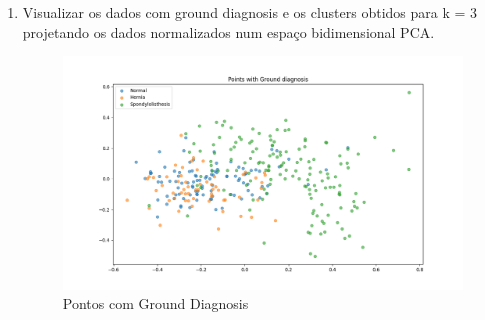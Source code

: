 \documentclass[a4paper,12pt]{article} %
\begin{document}
\begin{enumerate}
Entender a importância de cada variável nas componentes principais é crucial para interpretar e 
utilizar de forma eficiente a técnica do PCA e ajuda a melhorar a qualidade das análises. \\

Código Utilizado:

\begin{lstlisting}[language=Python]
pca = PCA(n_components=2)
pca.fit(features_scaled)
X_pca = pca.transform(features_scaled)

print("Components (eigenvectors):\n",pca.components_)
print("Explained variance (ratio) =",pca.explained_variance_ratio_)

xvector = pca.components_[0] * max(X_pca[:,0])
yvector = pca.components_[1] * max(X_pca[:,1])

columns = features.columns
features1_rel = {columns[i] : math.sqrt(xvector[i]**2) for i in range(len(columns))}
sorted_features1 = sorted(zip(features1_rel.values(), features1_rel.keys()),reverse=True)
print('Features sorted by relevance for the first component: \n')
for i in range(len(sorted_features1)):
    print(f'{sorted_features1[i][1]} : {sorted_features1[i][0]: .5f}')

features2_rel = {columns[i] : math.sqrt(yvector[i]**2) for i in range(len(columns))}
sorted_features2 = sorted(zip(features2_rel.values(), features2_rel.keys()),reverse=True)
print('\nFeatures sorted by relevance for the second component: \n')
for i in range(len(sorted_features2)):
    print(f'{sorted_features2[i][1]} : {sorted_features2[i][0]: .5f}')

features_rel = {columns[i] : math.sqrt(xvector[i]**2 + yvector[i]**2) for i in range(len(columns))}
sorted_features = sorted(zip(features_rel.values(), features_rel.keys()),reverse=True)
print('\nFeatures sorted by relevance: \n')
for i in range(len(sorted_features)):
    print(f'{sorted_features[i][1]} : {sorted_features[i][0]: .5f}')
    
\end{lstlisting}

\item Visualizar os dados com ground diagnosis e os clusters obtidos para k = 3 projetando os dados normalizados num espaço bidimensional PCA. \\

\begin{figure}[H]
      \centering
      \includegraphics[width=0.8\linewidth]{ex3_ground_diagnosis.png}
      \captionsetup{font=small} 
      \caption{Pontos com Ground Diagnosis}
\end{figure}


\end{enumerate}
\end{document}
